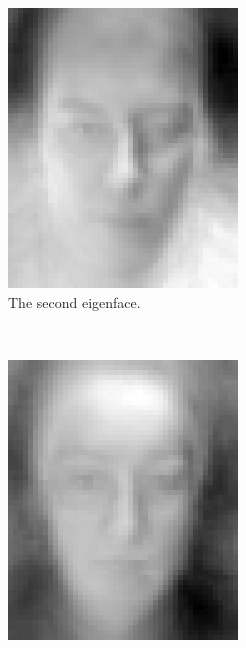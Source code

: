 \documentclass[a4paper, 10pt, conference]{ieeeconf}
\begin{document}
\begin{figure}[!ht]
\begin{subfigure}{0.1\textwidth}
          \includegraphics[width=\textwidth]{src/eigface5.png}
          \caption{The second eigenface.}
                \label{fig:eigface5}
        \end{subfigure}
        ~
        \begin{subfigure}{0.1\textwidth}
          \includegraphics[width=\textwidth]{src/eigface6.png}

\end{subfigure}
\end{figure}
\end{document}
